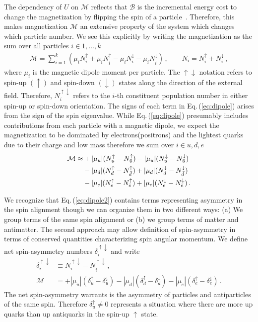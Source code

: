 \documentclass[epjST]{svjour}
\newcommand{\req}[1]{Eq.\,(\ref{#1})}
\begin{document}
The dependency of $U$ on $\mathcal{M}$ reflects that $\mathcal{B}$ is the incremental energy cost to change the magnetization by flipping the spin of a particle~\cite{Bali:2014kia}. Therefore, this makes magnetization $\mathcal{M}$ an extensive property of the system which changes which particle number. We see this explicitly by writing the magnetization as the sum over all particles $i\in{1,\ldots,k}$
\begin{align}
    \label{eq:dipole}
    \mathcal{M} = \sum_{i=1}^{k}(\mu_{i}N_{i}^{\uparrow} + \mu_{\bar{i}}N_{\bar{i}}^{\uparrow} - \mu_{i}N_{i}^{\downarrow} - \mu_{\bar{i}}N_{\bar{i}}^{\downarrow})\,,\qquad
    N_{i} = N_{i}^{\uparrow} + N_{i}^{\downarrow}\,,
\end{align}
where $\mu_{i}$ is the magnetic dipole moment per particle. The $\uparrow\downarrow$ notation refers to spin-up $(\uparrow)$ and spin-down $(\downarrow)$ states along the direction of the external field. Therefore, $N_{i}^{\uparrow\downarrow}$ refers to the $i$-th constituent population number in either spin-up or spin-down orientation. The signs of each term in \req{eq:dipole} arises from the sign of the spin eigenvalue. While \req{eq:dipole} presumably includes contributions from each particle with a magnetic dipole, we expect the magnetization to be dominated by electrons(positrons) and the lightest quarks due to their charge and low mass therefore we sum over $i\in{u,d,e}$
\begin{align}
    \notag\mathcal{M} \approx &+|\mu_{u}|(N_{u}^{\uparrow}-N_{\bar{u}}^{\uparrow})-|\mu_{u}|(N_{u}^{\downarrow}-N_{\bar{u}}^{\downarrow})\\
    \notag &-|\mu_{d}|(N_{d}^{\uparrow}-N_{\bar{d}}^{\uparrow})+|\mu_{d}|(N_{d}^{\downarrow}-N_{\bar{d}}^{\downarrow})\\
    \label{eq:dipole2}
    &-|\mu_{e}|(N_{e}^{\uparrow}-N_{\bar{e}}^{\uparrow})+|\mu_{e}|(N_{e}^{\downarrow}-N_{\bar{e}}^{\downarrow})\,.
\end{align}

We recognize that \req{eq:dipole2} contains terms representing asymmetry in the spin alignment though we can organize them in two different ways: (a) We group terms of the same spin alignment or (b) we group terms of matter and antimatter. The second approach may allow definition of spin-asymmetry in terms of conserved quantities characterizing spin angular momentum. We define net spin-asymmetry numbers $\delta_{i}^{\uparrow\downarrow}$ and write
\begin{align}
    \delta_{i}^{\uparrow\downarrow} &\equiv N_{i}^{\uparrow\downarrow}-N_{\bar{i}}^{\uparrow\downarrow}\,,\\
    \mathcal{M} &= 
    +|\mu_{u}|(\delta_{u}^{\uparrow}-\delta_{u}^{\downarrow})
    -|\mu_{d}|(\delta_{d}^{\uparrow}-\delta_{d}^{\downarrow})
    -|\mu_{e}|(\delta_{e}^{\uparrow}-\delta_{e}^{\downarrow})\,.
\end{align}
The net spin-asymmetry warrants is the asymmetry of particles and antiparticles of the same spin. Therefore $\delta_{u}^{\uparrow}\neq0$ represents a situation where there are more up quarks than up antiquarks in the spin-up $\uparrow$ state.
\end{document}
